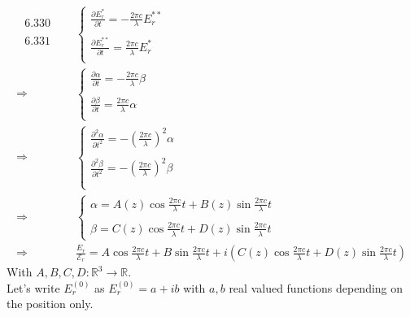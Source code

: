 \begin{align}
 \begin{array}{l}
\text{ 6.330}\\\\
\text{  6.331}\\
\end{array}
\quad &\left\{ \begin{array}{l}
\frac{\partial E^{*}_r}{\partial t} = -\frac{2\pi c}{\lambda} E^{**}_r\\\\
\frac{\partial E^{**}_r}{\partial t} = \frac{2\pi c}{\lambda}  E^{*}_r\\
\end{array}\right.\\
\Rightarrow &\left\{\begin{array}{l}
\frac{\partial \alpha}{\partial t} = -\frac{2\pi c}{\lambda} \beta\\\\
\frac{\partial \beta}{\partial t} = \frac{2\pi c}{\lambda}  \alpha\\
\end{array}\right.\\
\Rightarrow &\left\{\begin{array}{l}
\frac{\partial^2 \alpha}{\partial t^2} = -\left(\frac{2\pi c}{\lambda}\right) ^2 \alpha\\\\
\frac{\partial^2 \beta}{\partial t^2} = -\left(\frac{2\pi c}{\lambda}\right) ^2 \beta\\\\
\end{array}\right.\\
\Rightarrow &\left\{\begin{array}{l}
\alpha = A\left(z\right)\cos \frac{2\pi c}{\lambda}  t + B\left(z\right)\sin \frac{2\pi c}{\lambda}  t \\\\
\beta = C\left(z\right)\cos \frac{2\pi c}{\lambda}  t + D\left(z\right)\sin \frac{2\pi c}{\lambda}  t   
\end{array}\right.\\
\Rightarrow \quad & \frac{E^{}_r}{\mathcal{E}_r}=A\cos \frac{2\pi c}{\lambda} t + B\sin \frac{2\pi c}{\lambda} t+i\left(C\left(z\right)\cos \frac{2\pi c}{\lambda}  t + D\left(z\right)\sin \frac{2\pi c}{\lambda}  t \right)
\end{align}
With $A,B,C,D:\mathbb{R}^3\rightarrow \mathbb{R}$.\\
Let's write $E^{(0)}_r$ as $E^{(0)}_r = a+ib$ with $a, b$ real valued functions depending on the position only.
